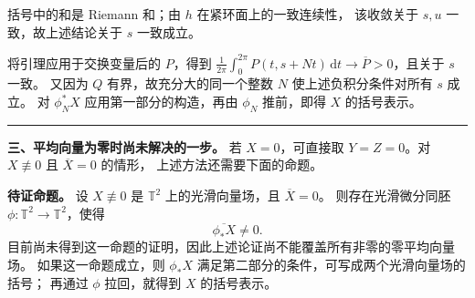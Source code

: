\documentclass[11pt,a4paper]{ctexart}
\newcommand{\T}{\mathbb T}
\newcommand{\dd}{\,\mathrm d}
\newcommand{\sep}{\par\vspace{5pt}\noindent\rule{\linewidth}{0.7pt}\par\vspace{5pt}}
\begin{document}
括号中的和是 Riemann 和；由 $h$ 在紧环面上的一致连续性，
该收敛关于 $s,u$ 一致，故上述结论关于 $s$ 一致成立。

将引理应用于交换变量后的 $P$，得到
$\frac1{2\pi}\int_0^{2\pi}P(t,s+Nt)\dd t\to\overline P>0$，且关于 $s$ 一致。
又因为 $Q$ 有界，故充分大的同一个整数 $N$ 使上述负积分条件对所有 $s$ 成立。
对 $\phi_N^*X$ 应用第一部分的构造，再由 $\phi_N$ 推前，即得 $X$ 的括号表示。
\sep
{}\textbf{三、平均向量为零时尚未解决的一步。}
若 $X=0$，可直接取 $Y=Z=0$。对 $X\not\equiv0$ 且 $\overline X=0$ 的情形，
上述方法还需要下面的命题。

\textbf{待证命题。} 设 $X\not\equiv0$ 是 $\T^2$ 上的光滑向量场，且 $\overline X=0$。
则存在光滑微分同胚 $\phi:\T^2\to\T^2$，使得
\[\overline{\phi_*X}\ne0.\]
目前尚未得到这一命题的证明，因此上述论证尚不能覆盖所有非零的零平均向量场。
如果这一命题成立，则 $\phi_*X$ 满足第二部分的条件，可写成两个光滑向量场的括号；
再通过 $\phi$ 拉回，就得到 $X$ 的括号表示。
\end{document}

